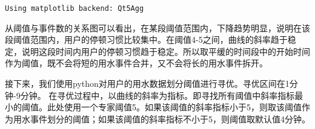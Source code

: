 \documentclass[11pt]{article}
\begin{document}
    \begin{Verbatim}[commandchars=\\\{\}]
Using matplotlib backend: Qt5Agg

    \end{Verbatim}

    从阈值与事件数的关系图可以看出，在某段阈值范围内，下降趋势明显，说明在该段阈值范围内，用户的停顿习惯比较集中。在阈值4-5之间，曲线的斜率趋于稳定，说明这段时间内用户的停顿习惯趋于稳定。所以取平缓的时间段中的开始时间作为阈值，既不会将短的用水事件合并，又不会将长的用水事件拆开。

接下来，我们使用python对用户的用水数据划分阈值进行寻优。寻优区间在1分钟-9分钟。
在寻优过程中，以曲线的斜率为指标。即寻找所有阈值中斜率指标最小的阈值。此处使用一个专家阈值5。如果该阈值的斜率指标小于5，则取该阈值作为用水事件划分的阈值；如果该阈值的斜率指标不小于5，则阈值取默认值4分钟。
\end{document}
